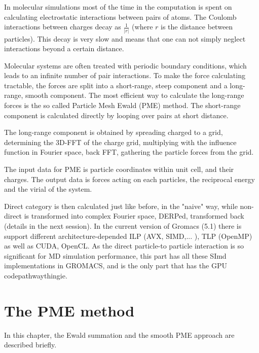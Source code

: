 \documentclass[12pt,a4paper]{report}
\newcommand{\draft}[1]{#1}
\begin{document}
In molecular simulations most of the time in the computation is spent on calculating electrostatic interactions between pairs of atoms. The Coulomb interactions between charges decay as $\frac{1}{\lvert r \rvert}$ (where $r$ is the distance between particles). This decay is very slow and means that one can not simply neglect interactions beyond a certain distance.

 Molecular systems are often treated with periodic boundary conditions, which leads to an infinite number of pair interactions. To make the force calculating tractable, the forces are split into a short-range, steep component and a long-range, smooth component. The most efficient way to calculate the long-range forces is the so called Particle Mesh Ewald (PME) method. The short-range component is calculated directly by looping over pairs at short distance. 
 
The long-range component is obtained by spreading charged to a grid, determining the 3D-FFT of the charge grid, multiplying with the influence function in Fourier space, back FFT, gathering the particle forces from the grid. 




The input data for PME is particle coordinates within unit cell, and their charges.  The output data is forces acting on each particles, the reciprocal energy and the virial of the system.

 Direct category is then calculated just like before, in the "naive" way, while non-direct is transformed into complex Fourier space, DERPed, transformed back (details in the next session).
In the current version of Gromacs (5.1) there is support different architecture-depended ILP (AVX, SIMD,... ), TLP (OpenMP) as well as CUDA, OpenCL. As the direct particle-to particle interaction is so significant for MD simulation performance, this part has all these SImd implementations in GROMACS, and is the only part that has the GPU codepathwaythingie.
\fi

\newpage

\chapter{The PME method}
In this chapter, the Ewald summation and the smooth PME approach are described briefly.

\end{document}
